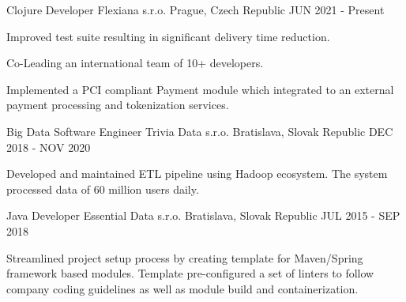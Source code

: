 

\begin{cventries}

  \cventry
    {Clojure Developer} %
    {Flexiana s.r.o.} %
    {Prague, Czech Republic} %
    {JUN 2021 - Present} %
    {
      \begin{cvitems} %
        \item {Improved test suite resulting in significant delivery time reduction.}
        \item {Co-Leading an international team of 10+ developers.}
        \item {Implemented a PCI compliant Payment module which integrated to an external payment processing and tokenization services.}
      \end{cvitems}
    }

  \cventry
    {Big Data Software Engineer} %
    {Trivia Data s.r.o.} %
    {Bratislava, Slovak Republic} %
    {DEC 2018 - NOV 2020} %
    {
      \begin{cvitems} %
        \item {Developed and maintained ETL pipeline using Hadoop ecosystem. The system processed data of 60 million users daily.}
      \end{cvitems}
    }

  \cventry
    {Java Developer} %
    {Essential Data s.r.o.} %
    {Bratislava, Slovak Republic} %
    {JUL 2015 - SEP 2018} %
    {
      \begin{cvitems} %
        \item {Streamlined project setup process by creating template for Maven/Spring framework based modules. Template pre-configured a set of linters to follow company coding guidelines as well as module build and containerization.}
      \end{cvitems}
    }
    

\end{cventries}
